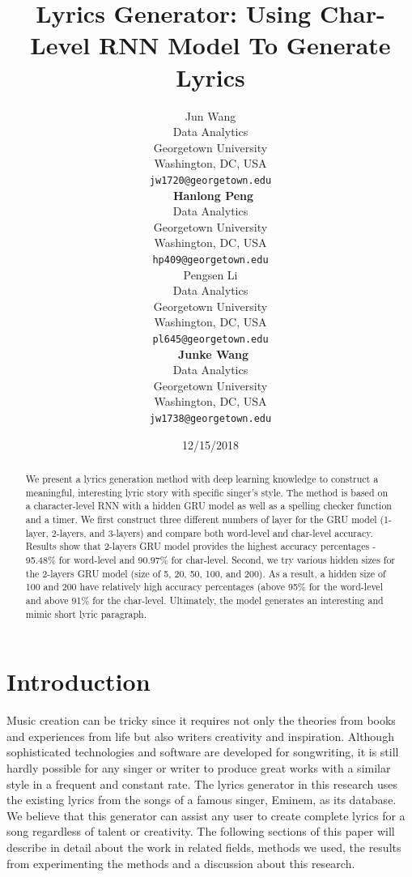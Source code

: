 \documentclass[11pt,a4paper]{article}
\title{Lyrics Generator: Using Char-Level RNN Model To Generate Lyrics}
\author{Jun Wang \\
  Data Analytics \\
  Georgetown University\\
  Washington, DC, USA \\
 {\tt jw1720@georgetown.edu} 
  \\\
  {\bf Hanlong Peng} \\
  Data Analytics \\
  Georgetown University\\
  Washington, DC, USA \\
  {\tt hp409@georgetown.edu} 
  \\\And
  Pengsen Li \\
  Data Analytics \\
  Georgetown University\\
  Washington, DC, USA \\
  {\tt pl645@georgetown.edu}
  \\\
  {\bf Junke Wang} \\
  Data Analytics \\
  Georgetown University\\
  Washington, DC, USA \\
  {\tt jw1738@georgetown.edu} 
  \\}
\date{12/15/2018}
\begin{document}
\maketitle
\begin{abstract}
We present a lyrics generation method with deep learning knowledge to construct a meaningful, interesting lyric story with specific singer's style. The method is based on a character-level RNN with a hidden GRU model as well as a spelling checker function and a timer. We first construct three different numbers of layer for the GRU model (1-layer, 2-layers, and 3-layers) and compare both word-level and char-level accuracy. Results show that 2-layers GRU model provides the highest accuracy percentages - 95.48\% for word-level and 90.97\% for char-level. Second, we try various hidden sizes for the 2-layers GRU model (size of 5, 20, 50, 100, and 200). As a result, a hidden size of 100 and 200 have relatively high accuracy percentages (above 95\% for the word-level and above 91\% for the char-level. Ultimately, the model generates an interesting and mimic short lyric paragraph.

\end{abstract}

\section{Introduction}
Music creation can be tricky since it requires not only the theories from books and experiences from life but also writers creativity and inspiration. Although sophisticated technologies and software are developed for songwriting, it is still hardly possible for any singer or writer to produce great works with a similar style in a frequent and constant rate. The lyrics generator in this research uses the existing lyrics from the songs of a famous singer, Eminem, as its database. We believe that this generator can assist any user to create complete lyrics for a song regardless of talent or creativity. The following sections of this paper will describe in detail about the work in related fields, methods we used, the results from experimenting the methods and a discussion about this research. 
\end{document}
